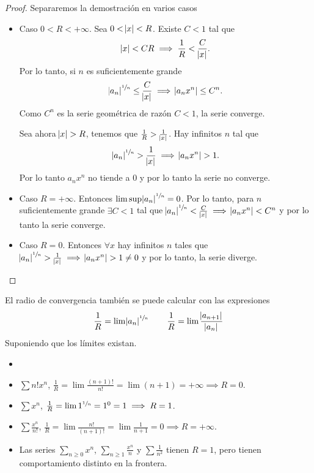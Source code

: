 \begin{proof}
    Separaremos la demostración en varios casos
    \begin{itemize}
        \item Caso $0 < R < + \infty$. Sea $0 < \abs{x} < R$. Existe $C < 1$ tal que
             \[
                \abs{x} < CR \implies \frac{1}{R} < \frac{C}{\abs{x}}.
            \]
            Por lo tanto, si $n$ es suficientemente grande
            \[
                \abs{a_n}^{\sfrac{1}{n}} \leq \frac{C}{\abs{x}} \implies
                \abs{a_nx^n} \leq C^n.
            \]
            Como $C^n$ es la serie geométrica de razón $C < 1$, la serie converge.

            Sea ahora $\abs{x} > R$, tenemos que $\frac{1}{R} > \frac{1}{\abs{x}}$.
            Hay infinitos $n$ tal que
            \[
                \abs{a_n}^{\sfrac{1}{n}} > \frac{1}{\abs{x}} \implies \abs{a_nx^n} > 1.
            \]
            Por lo tanto $a_nx^n$ no tiende a 0 y por lo tanto la serie no converge.
        \item Caso $R = +\infty$. Entonces $\limsup \abs{a_n}^{\sfrac{1}{n}} = 0$.
            Por lo tanto, para $n$ suficientemente grande $\exists C < 1$ tal que
            $\abs{a_n}^{\sfrac{1}{n}} < \frac{C}{\abs{x}} \implies \abs{a_nx^n} < C^n$ y por lo tanto
            la serie converge.
        \item Caso $R = 0$. Entonces $\forall x$ hay infinitos $n$ tales que
             $\abs{a_n}^{\sfrac{1}{n}} > \frac{1}{\abs{x}} \implies \abs{a_nx^n} > 1 \neq 0$
            y por lo tanto, la serie diverge.
    \end{itemize}
\end{proof}

\begin{obs}
    El radio de convergencia también se puede calcular con las expresiones
    \[
        \frac{1}{R} = \lim \abs{a_n}^{\sfrac{1}{n}} \qquad
        \frac{1}{R} = \lim \frac{\abs{a_{n+1}}}{\abs{a_n}}
    \]
    Suponiendo que los límites existan.
\end{obs}

\begin{example*}
    \begin{itemize}
        \item[]
        \item $\sum n!x^n$, $\frac{1}{R} = \lim \frac{(n+1)!}{n!} = \lim (n+1)
            = +\infty \implies R = 0$.
        \item $\sum x^n$, $\frac{1}{R} = \lim 1^{\sfrac{1}{n}} = 1^0 = 1 \implies
            R = 1$.
        \item $\sum \frac{x^n}{n!}$, $\frac{1}{R} = \lim \frac{n!}{(n+1)!} =
            \lim \frac{1}{n+1} = 0 \implies R = +\infty$.
        \item Las series $\sum\limits_{n \geq 0} x^n$, $\sum\limits_{n \geq 1} \frac{x^n}{n}$
            y $\sum \frac{1}{n^2}$ tienen $R = 1$, pero tienen comportamiento
            distinto en la frontera.
    \end{itemize}
\end{example*}

